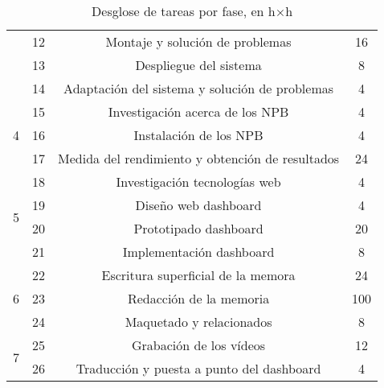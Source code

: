 \begin{table}[htpb]
\begin{tabular}{ |c|c|c|c| }
                            & 12    & {Montaje y solución de problemas}                                         & 16 \\\cline{2-4}
                            & 13    & {Despliegue del sistema}                                                  & 8 \\\cline{2-4}
                            & 14    & {Adaptación del sistema y solución de problemas}                          & 4 \\
  \hline
  \multirow{3}{*}{4}        & 15    & {Investigación acerca de los NPB}                                         & 4 \\\cline{2-4}
                            & 16    & {Instalación de los NPB}                                                  & 4 \\\cline{2-4}
                            & 17    & {Medida del rendimiento y obtención de resultados}                        & 24 \\
  \hline
  \multirow{4}{*}{5}        & 18    & {Investigación tecnologías web}                                           & 4 \\\cline{2-4}
                            & 19    & {Diseño web dashboard}                                                    & 4 \\\cline{2-4}
                            & 20    & {Prototipado dashboard}                                                   & 20 \\\cline{2-4}
                            & 21    & {Implementación dashboard}                                                & 8 \\
  \hline
  \multirow{3}{*}{6}        & 22    & {Escritura superficial de la memora}                                      & 24 \\\cline{2-4}
                            & 23    & {Redacción de la memoria}                                                 & 100 \\\cline{2-4}
                            & 24    & {Maquetado y relacionados}                                                & 8 \\
  \hline
  \multirow{2}{*}{7}        & 25    & {Grabación de los vídeos}                                      & 12 \\\cline{2-4}
                            & 26    & {Traducción y puesta a punto del dashboard}                    & 4 \\
  \hline
  \end{tabular}
  \caption{Desglose de tareas por fase, en h$\times$h}
  \label{tab:desglose_de_tareas}
\end{table}

